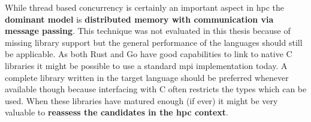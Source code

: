While thread based concurrency is certainly an important aspect in \gls{hpc} the \textbf{dominant model} is \textbf{distributed memory with communication via message passing}. This technique was not evaluated in this thesis because of missing library support but the general performance of the languages should still be applicable. As both Rust and Go have good capabilities to link to native C libraries it might be possible to use a standard \gls{mpi} implementation today. A complete library written in the target language should be preferred whenever available though because interfacing with C often restricts the types which can be used. When these libraries have matured enough (if ever) it might be very valuable to \textbf{reassess the candidates in the \gls{hpc} context}.
